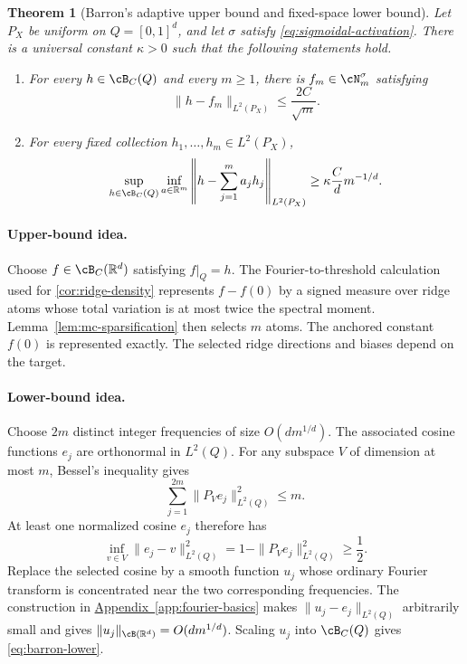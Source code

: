 \documentclass[11pt,twoside]{article}
\newcommand{\appendixref}[1]{\hyperref[#1]{Appendix~\ref*{#1}}}
\newcommand{\R}{\mathbb R}
\newtheorem{theorem}{Theorem}[section]
\theoremstyle{definition}
\theoremstyle{remark}
\begin{document}
\begin{theorem}[Barron's adaptive upper bound and fixed-space lower bound]
\label{thm:barron}
Let \(P_X\) be uniform on \(Q=[0,1]^d\), and let \(\sigma\) satisfy
\cref{eq:sigmoidal-activation}. There is a universal constant
\(\kappa>0\) such that the following statements hold.
\begin{enumerate}[label=(\roman*),leftmargin=*]
\item For every \(h\in\cB_C(Q)\) and every \(m\geq1\), there is
\(f_m\in\cN_m^\sigma\) satisfying
\begin{equation}
 \|h-f_m\|_{L^2(P_X)}\leq\frac{2C}{\sqrt m}.
 \label{eq:barron-upper}
\end{equation}
\item For every fixed collection \(h_1,\ldots,h_m\in L^2(P_X)\),
\begin{equation}
 \sup_{h\in\cB_C(Q)}
 \inf_{a\in\R^m}
 \left\|h-\sum_{j=1}^ma_jh_j\right\|_{L^2(P_X)}
 \geq \kappa\frac{C}{d}m^{-1/d}.
 \label{eq:barron-lower}
\end{equation}
\end{enumerate}
\end{theorem}

\paragraph{Upper-bound idea.}
Choose \(f\in\cB_C(\R^d)\) satisfying \(f|_Q=h\). The Fourier-to-threshold
calculation used for
\cref{cor:ridge-density} represents \(f-f(0)\) by a signed measure
over ridge atoms whose total variation is at most twice the spectral moment.
Lemma~\ref{lem:mc-sparsification} then selects \(m\) atoms. The anchored
constant \(f(0)\) is represented exactly. The selected ridge directions and
biases depend on the target.

\paragraph{Lower-bound idea.}
Choose \(2m\) distinct integer frequencies of size
\(O(dm^{1/d})\). The associated cosine functions \(e_j\) are orthonormal in
\(L^2(Q)\). For any subspace \(V\) of dimension at most \(m\), Bessel's
inequality gives
\[
 \sum_{j=1}^{2m}\|P_Ve_j\|_{L^2(Q)}^2\leq m.
\]
At least one normalized cosine \(e_j\) therefore has
\[
 \inf_{v\in V}\|e_j-v\|_{L^2(Q)}^2
 =1-\|P_Ve_j\|_{L^2(Q)}^2\geq\frac12.
\]
Replace the selected cosine by a smooth function \(u_j\) whose ordinary
Fourier transform is concentrated near the two corresponding frequencies.
The construction in \appendixref{app:fourier-basics} makes
\(\|u_j-e_j\|_{L^2(Q)}\) arbitrarily small and gives
\(\|u_j\|_{\cB(\R^d)}=O(dm^{1/d})\). Scaling \(u_j\) into
\(\cB_C(Q)\) gives \cref{eq:barron-lower}.
\end{document}
